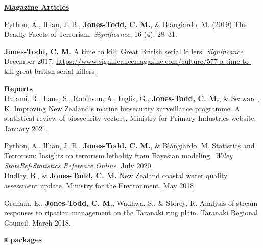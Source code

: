 \documentclass[10pt,a4paper]{moderncv}
\begin{document}
\underline{\textbf{Magazine Articles}}\\

\vspace{-3pt}

Python, A.,  Illian, J. B., \textbf{Jones-Todd, C. M.}, \& Bl\'{a}ngiardo, M. (2019) The Deadly Facets of Terrorism. \textit{Significance}, 16 (4), 28--31.\\

\vspace{-3pt}

\textbf{Jones-Todd, C. M.} A time to kill: Great British serial killers. \textit{Significance}. December 2017. \url{https://www.significancemagazine.com/culture/577-a-time-to-kill-great-british-serial-killers}\\

\vspace{2pt} 

\underline{\textbf{Reports}}\\

Hatami, R., Lane, S., Robinson, A.,  Inglis, G.,  \textbf{Jones-Todd, C. M.}, \& Seaward, K. Improving New Zealand’s marine biosecurity surveillance programme. A statistical review of biosecurity vectors.  Ministry for Primary Industries website. January 2021.\\

\vspace{-3pt}

Python, A.,  Illian, J. B., \textbf{Jones-Todd, C. M.}, \& Bl\'{a}ngiardo, M. Statistics and Terrorism: Insights on terrorism lethality from Bayesian modeling. \textit{Wiley StatsRef-Statistics Reference Online}. July 2020.\\

Dudley, B., \& \textbf{Jones-Todd, C. M.} New Zealand coastal water quality assessment update. Ministry for the Environment. May 2018.\\

\vspace{-3pt}

Graham, E., \textbf{Jones-Todd, C. M.}, Wadhwa, S., \& Storey, R. Analysis of stream responses to riparian management on the Taranaki ring plain. Taranaki Regional Council. March 2018.\\

\vspace{2pt}

\underline{\textbf{\texttt{R} packages}}\\
\vspace{-3pt}
\end{document}
